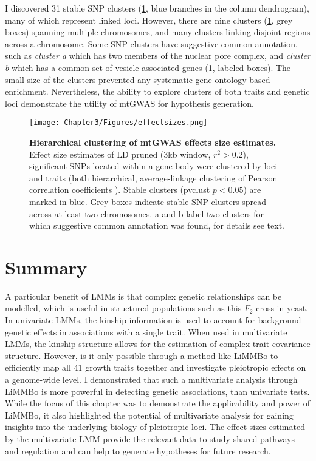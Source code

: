 I discovered \num{31} stable SNP clusters (\cref{fig:effectsizes}, blue branches in the column dendrogram), many of which represent linked loci. However, there are nine clusters (\cref{fig:effectsizes}, grey boxes) spanning multiple chromosomes, and many clusters linking disjoint regions across a chromosome. Some SNP clusters have suggestive common annotation, such as \textit{cluster a} which has two members of the nuclear pore complex, and \textit{cluster b} which has a common set of vesicle associated genes (\cref{fig:effectsizes}, labeled boxes). The small size of the clusters prevented any systematic gene ontology based enrichment. Nevertheless, the ability to explore clusters of both traits and genetic loci demonstrate the utility of mtGWAS for hypothesis generation.

\begin{figure}[hbtp]
	\centering
	\texttt{[image: Chapter3/Figures/effectsizes.png]}
	\caption[\textbf{Hierarchical clustering of mtGWAS effects size estimates.}]{\textbf{Hierarchical clustering of mtGWAS effects size estimates.} Effect size estimates of LD pruned (\num{3}kb window, \(r^2 > 0.2\)), significant SNPs located within a gene body were clustered by loci and traits (both hierarchical, average-linkage clustering of Pearson correlation coefficients ). Stable clusters (pvclust \( p < 0.05\)) are marked in blue. Grey boxes indicate stable SNP clusters spread across at least two chromosomes. a and b label two clusters for which suggestive common annotation was found, for details see text.}
 	\label{fig:effectsizes}
\end{figure}

\section{Summary}
A particular benefit of LMMs is that complex genetic relationships can be modelled, which is useful in structured populations such as this \(F_2\) cross in yeast. In univariate LMMs, the kinship information is used to account for background genetic effects in associations with a single trait. When used in multivariate LMMs, the kinship structure allows for the estimation of complex trait covariance structure. However, is it only possible through a method like LiMMBo to efficiently map all \num{41} growth traits together and investigate pleiotropic effects on a genome-wide level. I demonstrated that such a multivariate analysis through LiMMBo is more powerful in detecting genetic associations, than univariate tests. While the focus of this chapter was to demonstrate the applicability and power of  LiMMBo, it also highlighted the potential of multivariate analysis for gaining insights into the underlying biology of pleiotropic loci. The effect sizes estimated by the multivariate LMM provide the relevant data to study shared pathways and regulation and can help to generate hypotheses for future research.
